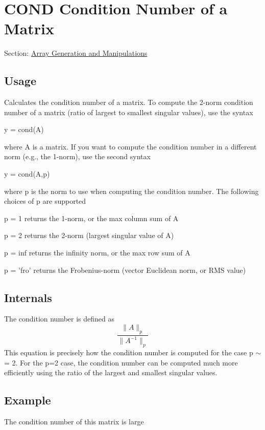  \hypertarget{array_cond}{}\section{C\-O\-N\-D Condition Number of a Matrix}\label{array_cond}
Section\-: \hyperlink{sec_array}{Array Generation and Manipulations} \hypertarget{vtkwidgets_vtkxyplotwidget_Usage}{}\subsection{Usage}\label{vtkwidgets_vtkxyplotwidget_Usage}
Calculates the condition number of a matrix. To compute the 2-\/norm condition number of a matrix (ratio of largest to smallest singular values), use the syntax \begin{DoxyVerb}   y = cond(A)
\end{DoxyVerb}
 where A is a matrix. If you want to compute the condition number in a different norm (e.\-g., the 1-\/norm), use the second syntax \begin{DoxyVerb}   y = cond(A,p)
\end{DoxyVerb}
 where {\ttfamily p} is the norm to use when computing the condition number. The following choices of {\ttfamily p} are supported 
\begin{DoxyItemize}
\item {\ttfamily p = 1} returns the 1-\/norm, or the max column sum of A  
\item {\ttfamily p = 2} returns the 2-\/norm (largest singular value of A)  
\item {\ttfamily p = inf} returns the infinity norm, or the max row sum of A  
\item {\ttfamily p = 'fro'} returns the Frobenius-\/norm (vector Euclidean norm, or R\-M\-S value)  
\end{DoxyItemize}\hypertarget{transforms_svd_Function}{}\subsection{Internals}\label{transforms_svd_Function}
The condition number is defined as \[ \frac{\|A\|_p}{\|A^{-1}\|_p} \] This equation is precisely how the condition number is computed for the case {\ttfamily p $\sim$= 2}. For the {\ttfamily p=2} case, the condition number can be computed much more efficiently using the ratio of the largest and smallest singular values. \hypertarget{variables_struct_Example}{}\subsection{Example}\label{variables_struct_Example}
The condition number of this matrix is large


